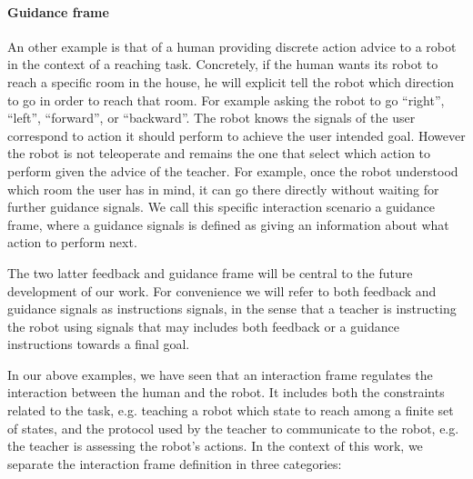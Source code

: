 \paragraph{Guidance frame} An other example is that of a human providing discrete action advice to a robot in the context of a reaching task. Concretely, if the human wants its robot to reach a specific room in the house, he will explicit tell the robot which direction to go in order to reach that room. For example asking the robot to go ``right'', ``left'', ``forward'', or ``backward''. The robot knows the signals of the user correspond to action it should perform to achieve the user intended goal. However the robot is not teleoperate and remains the one that select which action to perform given the advice of the teacher. For example, once the robot understood which room the user has in mind, it can go there directly without waiting for further guidance signals. We call this specific interaction scenario a guidance frame, where a guidance signals is defined as giving an information about what action to perform next.

The two latter feedback and guidance frame will be central to the future development of our work. For convenience we will refer to both feedback and guidance signals as instructions signals, in the sense that a teacher is instructing the robot using signals that may includes both feedback or a guidance instructions towards a final goal.

In our above examples, we have seen that an interaction frame regulates the interaction between the human and the robot. It includes both the constraints related to the task, e.g. teaching a robot which state to reach among a finite set of states, and the protocol used by the teacher to communicate to the robot, e.g. the teacher is assessing the robot's actions. In the context of this work, we separate the interaction frame definition in three categories:

